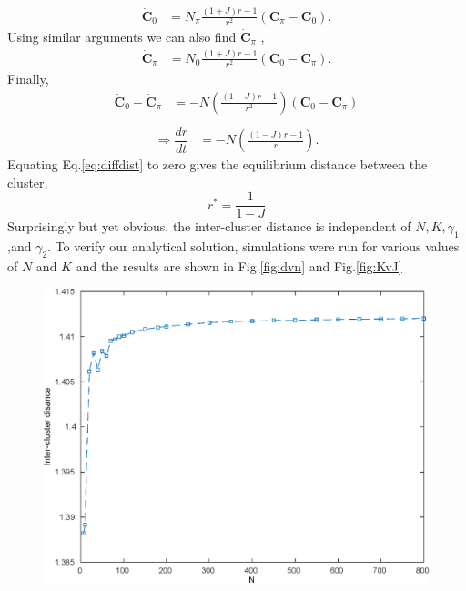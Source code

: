 \documentclass[twocolumn,10pt]{asme2ej}
\begin{document}
{{\begin{align*}
        \end{align*}
        \begin{align}
            \dot{\mathbf{C}}_0 &= N_\pi \frac{(1+J) r - 1}{r^2} (\mathbf{C}_\pi - \mathbf{C}_0).
        \end{align}
        Using similar arguments we can also find \(\dot{\mathbf{C}}_\pi\) ,
        \begin{align}
            \dot{\mathbf{C}}_\pi &= N_0 \frac{(1+J) r - 1}{r^2} (\mathbf{C}_0 - \mathbf{C}_\pi).
        \end{align}
        Finally,
        \begin{align*}
            \dot{\mathbf{C}}_0 - \dot{\mathbf{C}}_\pi &= -N \left(\frac{(1-J)r -1}{r^2}\right)(\mathbf{C}_0 - \mathbf{C}_\pi) \\
        \end{align*}
        \begin{align}\label{eq:diffdist}
            \Rightarrow \dfrac{dr}{dt} &= -N \left(\frac{(1-J)r -1}{r}\right).
        \end{align}
        Equating Eq.\ref*{eq:diffdist} to zero gives the equilibrium distance between the cluster,
        \begin{equation}\label{eq:eqdist}
            r^* = \frac{1}{1-J}
        \end{equation} %
        Surprisingly but yet obvious, the inter-cluster distance is independent of \(N,K,\gamma_1\),and \(\gamma_2\). To verify our analytical solution, simulations were run for various values of \(N\) and \(K\) and the results are shown in Fig.\ref{fig:dvn} and Fig.\ref{fig:KvJ}
        \begin{figure}[h!]
            \includegraphics[width = \linewidth]{dvn.eps}

\end{figure}}}
\end{document}
